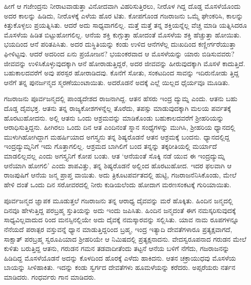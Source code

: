 ಹೀಗೆ ಆ ಗಜೇಂದ್ರನು ನೀರಾಟವಾಡುತ್ತಾ ವಿನೋದವಾಗಿ ವಿಹರಿಸುತ್ತಿರಲು, ನೀರೊಳ ಗಿದ್ದ ದೊಡ್ಡ ಮೊಸಳೆಯೊಂದು ಅದರ ಕಾಲನ್ನು ಹಿಡಿದು, ನೀರೊಳಕ್ಕೆ ಎಳೆಯ ಹೊರ ಟಿತು. ಕೋಪಗೊಂಡ ಗಜರಾಜನು ಒಮ್ಮೆ ಘೇಂಕರಿಸಿ, ಕಾಲನ್ನು ಕಿತ್ತುಕೊಳ್ಳಲು ಪ್ರಯತ್ನಿಸಿತು. ಆದರೆ ಅದು ಸಾಧ್ಯವಾಗಲಿಲ್ಲ. ಮತ್ತೆ ಮತ್ತೆ ತನ್ನ ಶಕ್ತಿಯನ್ನೆಲ್ಲ ವೆಚ್ಚ ಮಾಡಿ ಯತ್ನಿಸಿದರೂ ಮೊಸಳೆಯ ಹಿಡಿತ ಬಿಟ್ಟುಹೋಗಲಿಲ್ಲ. ಆನೆಯ ಶಕ್ತಿ ಕುಗ್ಗುತ್ತಾ ಹೋದಂತೆ ಮೊಸಳೆಯ ಶಕ್ತಿ ಹೆಚ್ಚುತ್ತಾ ಹೋಯಿತು. ಭಯದಿಂದ ಆನೆ ಪರಿತಪಿಸಿತು. ಅದರ ದುಸ್ಥಿತಿಯನ್ನು ಕಂಡು ಉಳಿದ ಆನೆಗಳೆಲ್ಲ ದುಃಖದಿಂದ ಕಣ್ಣೀರ್ಗರೆಯುತ್ತಾ ಘೀಳಿಟ್ಟವು. ಆದರೆ ಅದರಿಂದ ಏನು ಪ್ರಯೋಜನ? ಭಯಂಕರವಾದ ಆ ಮೊಸಳೆಯನ್ನು ಯಾರು ಬಿಡಿಸುವವರು? ಜೀವವನ್ನು ಉಳಿಸಿಕೊಳ್ಳುವುದಕ್ಕಾಗಿ ಆನೆ ಹೋರಾಡುತ್ತಿದ್ದರೆ, ಅದರ ಜೀವವನ್ನು ಹೀರುವುದಕ್ಕಾಗಿ ಮೊಸಳೆ ಕಾದುತ್ತಿದೆ. ಬಹುಕಾಲದವರೆಗೆ ಅವು ಪರಸ್ಪರ ಹೋರಾಡಿದವು. ಕೊನೆಗೆ ಸೋತು, ಸಂಕಟದಿಂದ ಸಾವನ್ನು ಇದಿರುನೋಡು ತ್ತಿದ್ದ ಆನೆಗೆ ತನ್ನ ಪುನರ್ಜನ್ಮದ ಸ್ಮರಣೆಯುಂಟಾಯಿತು. ಅದರೊಡನೆ ಅದಕ್ಕೆ ಎಲ್ಲೆ ಯಿಲ್ಲದ ಧೈರ್ಯವೂ ಮೂಡಿತು.

ಗಜರಾಜನು ಪೂರ್ವಜನ್ಮದಲ್ಲಿ ಪಾಂಡ್ಯದೇಶದ ರಾಜನಾಗಿದ್ದ. ಆತನ ಹೆಸರು ಇಂದ್ರ ದ್ಯುಮ್ನ ಎಂದು. ಆತನು ಬಹು ದೊಡ್ಡ ದೈವಭಕ್ತ. ಆತನು ತನ್ನ ರಾಜ್ಯಕೋಶಗಳನ್ನೆಲ್ಲ ತೊರೆದು, ತಪಸ್ಸು ಮಾಡುವುದಕ್ಕಾಗಿ ಮಲಯ ಪರ್ವತಕ್ಕೆ ಹೊರಟುಹೋದನು. ಅಲ್ಲಿ ಆತನು ಒಂದು ಆಶ್ರಮವನ್ನು ಮಾಡಿಕೊಂಡು ಬಹುಕಾಲದವರೆಗೆ ಶ್ರೀಹರಿಯನ್ನು ಆರಾಧಿಸುತ್ತಿದ್ದನು. ಹೀಗಿರಲು ಒಂದು ದಿನ ಆತ ಎಂದಿನಂತೆ ಸ್ನಾನ ಸಂಧ್ಯೆಗಳನ್ನು ಮುಗಿಸಿ, ಶ್ರೀಹರಿಯ ಧ್ಯಾನದಲ್ಲಿ ಮುಳುಗಿಹೋಗಿದ್ದಾಗ ಮಹರ್ಷಿಯಾದ ಅಗಸ್ತ್ಯನು ತನ್ನ ಶಿಷ್ಯರೊಡನೆ ಆತನ ಆಶ್ರಮಕ್ಕೆ ಬಂದನು. ಧ್ಯಾನದಲ್ಲಿದ್ದ ಇಂದ್ರದ್ಯುಮ್ನನಿಗೆ ಇದು ಗೊತ್ತಾಗಲಿಲ್ಲ. ಆಶ್ರಮದ ಬಾಗಿಲಿಗೆ ಬಂದ ತನ್ನನ್ನು ತಕ್ಕರೀತಿಯಲ್ಲಿ ಮರ್ಯಾದೆ ಮಾಡಲಿಲ್ಲವಲ್ಲ ಎಂದು ಅಗಸ್ತ್ಯನಿಗೆ ಕೋಪ ಬಂತು. ಆತ ‘ಆನೆಯಂತೆ ಸೊಕ್ಕಿ ನಡೆ ಯುವ ಈ ಇಂದ್ರದ್ಯುಮ್ನ ಆನೆಯಾಗಿ ಹೋಗಲಿ’ ಎಂದು ಶಾಪವಿತ್ತು, ತನ್ನ ಶಿಷ್ಯರೊಡನೆ ಅಲ್ಲಿಂದ ಹೊರಟುಹೋದ. ಇದರ ಫಲವಾಗಿ ಆ ರಾಜಪುಷಿಗೆ ಆನೆಯ ಜನ್ಮ ಪ್ರಾಪ್ತ ವಾಯಿತು. ಅದು ತ್ರಿಕೂಟಪರ್ವತದಲ್ಲಿ ಹುಟ್ಟಿ, ಗಜರಾಜನೆನಿಸಿಕೊಂಡು, ಮೇಲೆ ಹೇಳಿ ದಂತೆ ಒಂದು ದಿನ ಸರೋವರದಲ್ಲಿ ನೀರು ಕುಡಿಯಲೆಂದು ಹೋದಾಗ ಮರಣಸಂಕಟಕ್ಕೆ ಗುರಿಯಾಯಿತು.

ಪೂರ್ವಜನ್ಮದ ಜ್ಞಾಪಕ ಮೂಡುತ್ತಲೆ ಗಜರಾಜನು ತನ್ನ ಆರಾಧ್ಯ ದೈವವನ್ನು ಮರೆ ಹೊಕ್ಕಿತು. ಹಿಂದಿನ ಜನ್ಮದಲ್ಲಿ ದಿನವೂ ಹೇಳುತ್ತಿದ್ದ ಪರಬ್ರಹ್ಮ ಸ್ತುತಿಯನ್ನು ಅದು ಇಂದು ಜಪಿಸಿತು. ಹಿಂದಿನ ಜನ್ಮದಂತೆ ಈಗ ನಮಸ್ಕರಿಸುವುದಕ್ಕೆ ಸಾಧ್ಯವಿಲ್ಲವಾದುದ ರಿಂದ ಮನಸ್ಸಿನಲ್ಲಿಯೇ ಅದು ದೈವಕ್ಕೆ ನಮಸ್ಕಾರವನ್ನು ಸಲ್ಲಿಸಿತು. ಯಾವ ನಾಮ ರೂಪಗಳನ್ನೂ ನೆನೆಯದೆ ಪರಾತ್ಪರ ವಸ್ತುವನ್ನೆ ಧ್ಯಾನ ಮಾಡುತ್ತಿದ್ದರಿಂದ ಬ್ರಹ್ಮ, ಇಂದ್ರ ಇತ್ಯಾದಿ ದೇವತೆಗಳಾರೂ ಪ್ರತ್ಯಕ್ಷವಾಗದೆ, ಸಾಕ್ಷಾತ್ ಪರಬ್ರಹ್ಮ ಸ್ವರೂಪಿಯಾದ ಶ್ರೀಹರಿಯೇ ಆ ನಿಮಿಷದಲ್ಲಿ ಪ್ರತ್ಯಕ್ಷನಾದನು. ವೇದಸ್ವರೂಪನಾದ ಗರುಡನ ಮೇಲೆ ಕುಳಿತು ಬರುತ್ತಿದ್ದ ಆತನು, ಗರುಡನ ಗಮನ ತಡವಾದೀತೆಂದು ತಟ್ಟನೆ ಆನೆಯ ಬಳಿಗೆ ನೆಗೆದು, ಗಜರಾಜನನ್ನು ಹಿಡಿದಿದ್ದ ಮೊಸಳೆಯೊಡನೆ ಅದನ್ನು ಕೊಳದಿಂದ ಹೊರಕ್ಕೆ ಎಳೆದು ಹಾಕಿದನು. ಆತನ ಚಕ್ರಾಯುಧವು ಮೊಸಳೆಯ ಬಾಯನ್ನು ಸೀಳಿಹಾಕಿತು. ಇದನ್ನು ಕಂಡು ಸ್ವರ್ಗದ ದೇವತೆಗಳು ಹೂಮಳೆಯನ್ನು ಕರೆದರು. ಅಪ್ಸರೆಯರು ನರ್ತನ ಮಾಡಿದರು. ಗಂಧರ್ವರು ಗಾನ ಮಾಡಿದರು.

